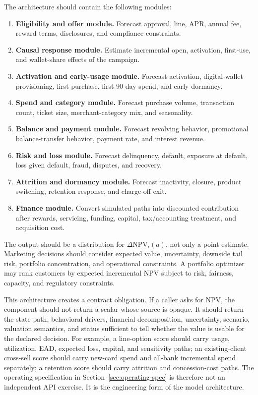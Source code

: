 \documentclass[11pt]{article}
\newcommand{\NPV}{\mathrm{NPV}}
\newcommand{\1}{\mathbf{1}}
\begin{document}
The architecture should contain the following modules:
\begin{enumerate}[label=\arabic*.]
  \item \textbf{Eligibility and offer module.} Forecast approval, line, APR,
        annual fee, reward terms, disclosures, and compliance constraints.
  \item \textbf{Causal response module.} Estimate incremental open, activation,
        first-use, and wallet-share effects of the campaign.
  \item \textbf{Activation and early-usage module.} Forecast activation,
        digital-wallet provisioning, first purchase, first 90-day spend, and
        early dormancy.
  \item \textbf{Spend and category module.} Forecast purchase volume,
        transaction count, ticket size, merchant-category mix, and seasonality.
  \item \textbf{Balance and payment module.} Forecast revolving behavior,
        promotional balance-transfer behavior, payment rate, and interest
        revenue.
  \item \textbf{Risk and loss module.} Forecast delinquency, default, exposure
        at default, loss given default, fraud, disputes, and recovery.
  \item \textbf{Attrition and dormancy module.} Forecast inactivity, closure,
        product switching, retention response, and charge-off exit.
  \item \textbf{Finance module.} Convert simulated paths into discounted
        contribution after rewards, servicing, funding, capital, tax/accounting
        treatment, and acquisition cost.
\end{enumerate}

The output should be a distribution for $\Delta \NPV_i(a)$, not only a point
estimate. Marketing decisions should consider expected value, uncertainty,
downside tail risk, portfolio concentration, and operational constraints. A
portfolio optimizer may rank customers by expected incremental NPV subject to
risk, fairness, capacity, and regulatory constraints.

This architecture creates a contract obligation. If a caller asks for NPV, the
component should not return a scalar whose source is opaque. It should return
the state path, behavioral drivers, financial decomposition, uncertainty,
scenario, valuation semantics, and status sufficient to tell whether the value
is usable for the declared decision. For example, a line-option score should
carry usage, utilization, EAD, expected loss, capital, and sensitivity paths;
an existing-client cross-sell score should carry new-card spend and all-bank
incremental spend separately; a retention score should carry attrition and
concession-cost paths. The operating specification in
Section~\ref{sec:operating-spec} is therefore not an independent API exercise.
It is the engineering form of the model architecture.
\end{document}
